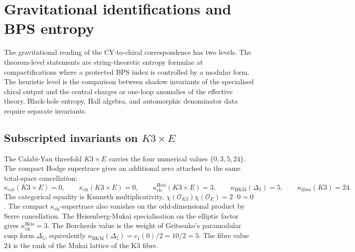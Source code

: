 \providecommand{\kBKM}{\kappa_{\mathrm{BKM}}}
\providecommand{\kch}{\kappa_{\mathrm{ch}}}
\providecommand{\kcat}{\kappa_{\mathrm{cat}}}
\providecommand{\kfib}{\kappa_{\mathrm{fiber}}}
\providecommand{\Z}{\mathbb{Z}}
\providecommand{\C}{\mathbb{C}}
\providecommand{\cO}{\mathcal{O}}
\providecommand{\cW}{\mathcal{W}}
\providecommand{\cI}{\mathcal{I}}
\providecommand{\bP}{\mathbb{P}}
\providecommand{\Etwo}{E_2}
\providecommand{\Eone}{E_1}
\providecommand{\DT}{\mathrm{DT}}
\providecommand{\CoHA}{\mathrm{CoHA}}

\section*{Gravitational identifications and BPS entropy}
\label{sec:gravitational-witten}

The gravitational reading of the CY-to-chiral correspondence has two
levels. The theorem-level statements are string-theoretic entropy
formulae at compactifications where a protected BPS index is controlled
by a modular form. The heuristic level is the comparison between shadow
invariants of the specialised chiral output and the central charges or
one-loop anomalies of the effective theory. Black-hole entropy, Hall
algebra, and automorphic denominator data require separate invariants.

\subsection*{Subscripted invariants on \texorpdfstring{$K3 \times E$}{K3 x E}}

The Calabi-Yau threefold \(K3 \times E\) carries the four numerical
values \(\{0,3,5,24\}\). The compact Hodge supertrace gives an
additional zero attached to the same total-space cancellation:
\[
\kappa_{\mathrm{cat}}(K3 \times E)=0,\qquad
\kappa_{\mathrm{ch}}(K3 \times E)=0,\qquad
\kappa_{\mathrm{ch}}^{\mathrm{Heis}}(K3 \times E)=3,\qquad
\kappa_{\mathrm{BKM}}(\Delta_5)=5,\qquad
\kappa_{\mathrm{fiber}}(K3)=24.
\]
The categorical equality is Kunneth multiplicativity,
\(\chi(\cO_{K3})\chi(\cO_E)=2\cdot 0=0\). The compact
\(\kch\)-supertrace also vanishes on the odd-dimensional product by
Serre cancellation. The Heisenberg-Mukai specialisation on the elliptic
factor gives \(\kch^{\mathrm{Heis}}=3\). The Borcherds value is the
weight of Gritsenko's paramodular cusp form \(\Delta_5\), equivalently
\(\kBKM(\Delta_5)=c_1(0)/2=10/2=5\). The fibre value \(24\) is the
rank of the Mukai lattice of the K3 fibre.

